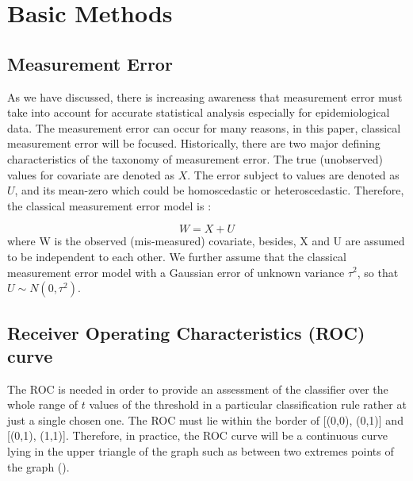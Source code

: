 
\chapter{Basic Methods} %

\label{Chapter2} %


\section{Measurement Error}


As we have discussed, there is increasing awareness that measurement error must take into account for accurate statistical analysis especially for epidemiological data. The measurement error can occur for many reasons, in this paper, classical measurement error will be focused. Historically, there are two major defining characteristics of the taxonomy of measurement error.  The true (unobserved) values for covariate are denoted as $X$. The error subject to values are denoted as $U$, and its mean-zero which could be homoscedastic or heteroscedastic. Therefore, the classical measurement error model is :

\begin{equation} \label{eqn_measurement error}
W = X + U
\end{equation}
where W is the observed (mis-measured) covariate, besides, X and U are assumed to be independent to each other. We further assume that the classical measurement error model with a Gaussian error of unknown variance $\tau^2$, so that $U \sim N(0, \tau^2)$.


\section{Receiver Operating Characteristics (ROC) curve}

\par \quad The ROC is needed in order to provide an assessment of the classifier over the whole range of $t$ values of the threshold in a particular classification rule rather at just a single chosen one. The ROC must lie within the border of [(0,0), (0,1)] and [(0,1), (1,1)]. Therefore, in practice, the ROC curve will be a continuous curve lying in the upper triangle of the graph such as between two extremes points of the graph (\cite{krzanowski2009roc}).


